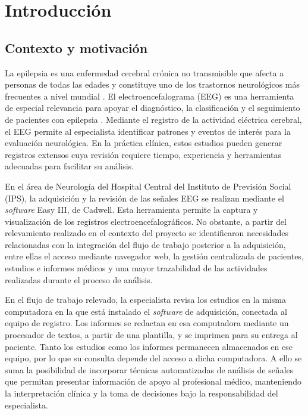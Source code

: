 \chapter{Introducción}
\label{chap1}
\ifpdf
  \graphicspath{{Chapter1/Chapter1Figs/PNG/}{Chapter1/Chapter1Figs/PDF/}{Chapter1/Chapter1Figs/}}
\else
  \graphicspath{{Chapter1/Chapter1Figs/EPS/}{Chapter1/Chapter1Figs/}}
\fi


\section{Contexto y motivación}
\label{sec:contexto-motivacion}

La epilepsia es una enfermedad cerebral crónica no transmisible que afecta a personas de todas las edades y constituye uno de los trastornos neurológicos más frecuentes a nivel mundial \citep{WHO2024Epilepsy}. El electroencefalograma (EEG) es una herramienta de especial relevancia para apoyar el diagnóstico, la clasificación y el seguimiento de pacientes con epilepsia \citep{NoachtarRemi2009}. Mediante el registro de la actividad eléctrica cerebral, el EEG permite al especialista identificar patrones y eventos de interés para la evaluación neurológica. En la práctica clínica, estos estudios pueden generar registros extensos cuya revisión requiere tiempo, experiencia y herramientas adecuadas para facilitar su análisis.

En el área de Neurología del Hospital Central del Instituto de Previsión Social (IPS), la adquisición y la revisión de las señales EEG se realizan mediante el \textit{software} Easy III, de Cadwell. Esta herramienta permite la captura y visualización de los registros electroencefalográficos. No obstante, a partir del relevamiento realizado en el contexto del proyecto se identificaron necesidades relacionadas con la integración del flujo de trabajo posterior a la adquisición, entre ellas el acceso mediante navegador web, la gestión centralizada de pacientes, estudios e informes médicos y una mayor trazabilidad de las actividades realizadas durante el proceso de análisis.

En el flujo de trabajo relevado, la especialista revisa los estudios en la misma computadora en la que está instalado el \textit{software} de adquisición, conectada al equipo de registro. Los informes se redactan en esa computadora mediante un procesador de textos, a partir de una plantilla, y se imprimen para su entrega al paciente. Tanto los estudios como los informes permanecen almacenados en ese equipo, por lo que su consulta depende del acceso a dicha computadora. A ello se suma la posibilidad de incorporar técnicas automatizadas de análisis de señales que permitan presentar información de apoyo al profesional médico, manteniendo la interpretación clínica y la toma de decisiones bajo la responsabilidad del especialista.

